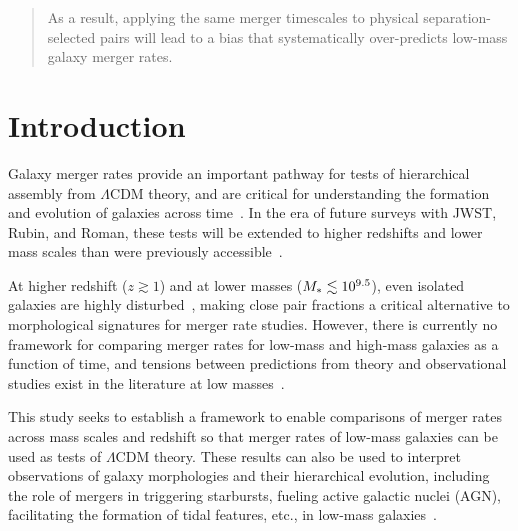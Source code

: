 \documentclass[twocolumn,linenumbers]{aastex631}
\begin{document}
\begin{abstract}
    As a result, applying the same merger timescales to physical separation-selected pairs will lead to a bias that systematically over-predicts low-mass galaxy merger rates. 

\end{abstract}


\section{Introduction} \label{sec:intro}
Galaxy merger rates provide an important pathway for tests of hierarchical assembly from $\Lambda$CDM theory, and are critical for understanding the formation and evolution of galaxies across time~\citep[e.g.][]{Stewart2009, Hopkins2010b,RG2015}. 
In the era of future surveys with JWST, Rubin, and Roman, these tests will be extended to higher redshifts and lower mass scales than were previously accessible~\citep{Gardner2006,Spergel2015,Robertson2019a,Robertson2019b,Behroozi2020,Martin2022}.  

At higher redshift ($z\gtrsim1$) and at lower masses ($M_{*{}} \lesssim10^{9.5}$), even isolated galaxies are highly disturbed~\citep{Wuyts2012,Wuyts2013,Martin2018,RG2019,Martin2021}, making close pair fractions a critical alternative to morphological signatures for merger rate studies.
However, there is currently no framework for comparing merger rates for low-mass and high-mass galaxies as a function of time, and tensions between predictions from theory and observational studies exist in the literature at low masses~\citep[see e.g. Fig.~10 in][]{RG2015}. 

This study seeks to establish a framework to enable comparisons of merger rates across mass scales and redshift so that merger rates of low-mass galaxies can be used as tests of $\Lambda$CDM theory. 
These results can also be used to interpret observations of galaxy morphologies and their hierarchical evolution, including the role of mergers in triggering starbursts, fueling active galactic nuclei (AGN), facilitating the formation of tidal features, etc., in low-mass galaxies~\citep[e.g.][]{Stierwalt2015,Pearson2016,Privon2017,Kristensen2021,Martin2021,Luber2022,Martin2022,GuzmanOrtega2023,ByrneMamahit2024,KadoFong2024}. 
\end{document}
